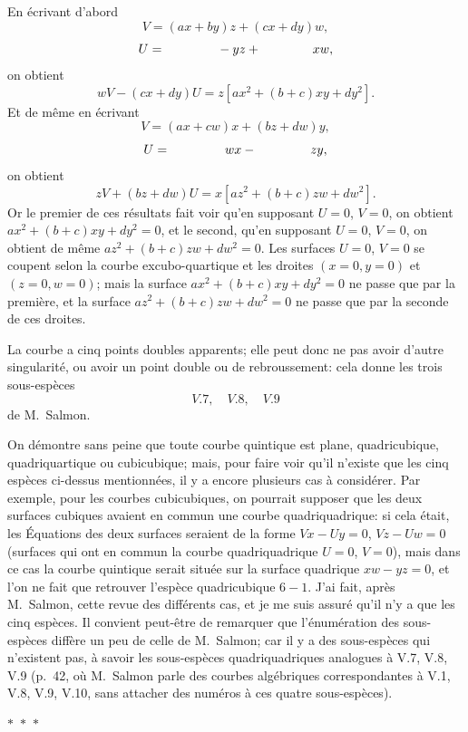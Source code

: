 \documentclass[11pt,a4paper]{article}
\newcommand{\asterism}{\par\begin{center}$\ast$~$\ast$~$\ast$\end{center}\par}
\begin{document}
En \'{e}crivant d'abord
\[
V = (ax + by)z + (cx + dy)w,
\]
\[
U = \hphantom{(ax + by)} - yz + \hphantom{(cx + dy)} xw,
\]
on obtient
\[
wV - (cx + dy)U = z[ax^2 + (b+c)xy + dy^2].
\]
Et de m\^{e}me en \'{e}crivant
\[
V = (ax + cw)x + (bz + dw)y,
\]
\[
U = \hphantom{(ax + cw)} wx - \hphantom{(bz + dw)} zy,
\]
on obtient
\[
zV + (bz + dw)U = x[az^2 + (b+c)zw + dw^2].
\]
Or le premier de ces r\'{e}sultats fait voir qu'en supposant $U = 0$, $V = 0$, on obtient $ax^2 + (b+c)xy + dy^2 = 0$, et le second, qu'en supposant $U = 0$, $V = 0$, on obtient de m\^{e}me $az^2 + (b+c)zw + dw^2 = 0$. Les surfaces $U = 0$, $V = 0$ se coupent selon la courbe excubo-quartique et les droites $(x = 0, y = 0)$ et $(z = 0, w = 0)$; mais la surface $ax^2 + (b+c)xy + dy^2 = 0$ ne passe que par la premi\`{e}re, et la surface $az^2 + (b+c)zw + dw^2 = 0$ ne passe que par la seconde de ces droites.

\clearpage

La courbe a cinq points doubles apparents; elle peut donc ne pas avoir d'autre singularit\'{e}, ou avoir un point double ou de rebroussement: cela donne les trois sous-esp\`{e}ces
\[
V.7, \quad V.8, \quad V.9
\]
de M.~Salmon.

On d\'{e}montre sans peine que toute courbe quintique est plane, quadricubique, quadriquartique ou cubicubique; mais, pour faire voir qu'il n'existe que les cinq esp\`{e}ces ci-dessus mentionn\'{e}es, il y a encore plusieurs cas \`{a} consid\'{e}rer. Par exemple, pour les courbes cubicubiques, on pourrait supposer que les deux surfaces cubiques avaient en commun une courbe quadriquadrique: si cela \'{e}tait, les \'{E}quations des deux surfaces seraient de la forme $Vx - Uy = 0$, $Vz - Uw = 0$ (surfaces qui ont en commun la courbe quadriquadrique $U = 0$, $V = 0$), mais dans ce cas la courbe quintique serait situ\'{e}e sur la surface quadrique $xw - yz = 0$, et l'on ne fait que retrouver l'esp\`{e}ce quadricubique $6 - 1$. J'ai fait, apr\`{e}s M.~Salmon, cette revue des diff\'{e}rents cas, et je me suis assur\'{e} qu'il n'y a que les cinq esp\`{e}ces. Il convient peut-\^{e}tre de remarquer que l'\'{e}num\'{e}ration des sous-esp\`{e}ces diff\`{e}re un peu de celle de M.~Salmon; car il y a des sous-esp\`{e}ces qui n'existent pas, \`{a} savoir les sous-esp\`{e}ces quadriquadriques analogues \`{a} V.7, V.8, V.9 (p.~42, o\`{u} M.~Salmon parle des courbes alg\'{e}briques correspondantes \`{a} V.1, V.8, V.9, V.10, sans attacher des num\'{e}ros \`{a} ces quatre sous-esp\`{e}ces).

\asterism
\end{document}
